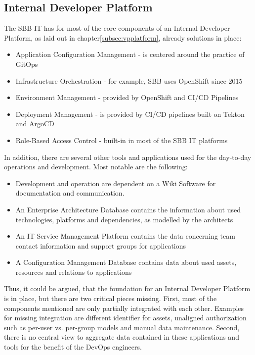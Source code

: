 \documentclass[a4paper,12pt]{article}
\begin{document}
    \subsection{Internal Developer Platform}
    \label{subsec:sbbplatform}
    The SBB IT has for most of the core components of an Internal Developer Platform, as laid out in chapter\ref{subsec:vpplatform},
    already solutions in place:
    \begin{itemize}
        \item Application Configuration Management - is centered around the practice of GitOps\parencite{hashicorpvault}
        \item Infrastructure Orchestration - for example, SBB uses OpenShift since 2015\parencite{rhsbbopenshift}
        \item Environment Management - provided by OpenShift and CI/CD Pipelines
        \item Deployment Management - is provided by CI/CD pipelines built on Tekton and ArgoCD\parencite{sbbtekton}
        \item Role-Based Access Control - built-in in most of the SBB IT platforms
    \end{itemize}
    In addition, there are several other tools and applications used for the day-to-day operations and development.
    Most notable are the following:
    \begin{itemize}
        \item Development and operation are dependent on a Wiki Software for documentation and communication.
        \item An Enterprise Architecture Database contains the information about used technologies, platforms and
        dependencies, as modelled by the architects
        \item An IT Service Management Platform contains the data concerning team contact information and support groups for applications
        \item A Configuration Management Database contains data about used assets, resources and relations to applications
    \end{itemize}
    Thus, it could be argued, that the foundation for an Internal Developer Platform is in place, but there are two
    critical pieces missing.
    First, most of the components mentioned are only partially integrated with each other.
    Examples for missing integration are different identifier for assets, unaligned authorization such as per-user vs.
    per-group models and manual data maintenance.
    Second, there is no central view to aggregate data contained in these applications and tools for the benefit of
    the DevOps engineers.
\end{document}
